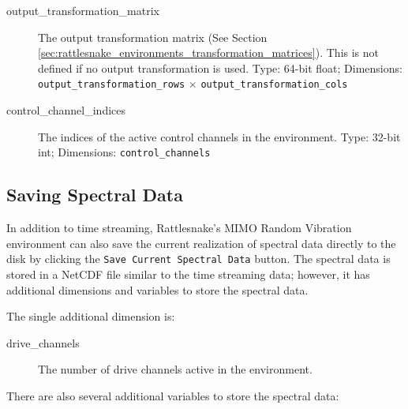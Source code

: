 \documentclass[pdf,12pt,report]{SANDreport}
\newcommand{\inlineCode}{\lstinline[basicstyle=\bfseries\ttfamily]}
\begin{document}
\begin{description}
        \item[output\_transformation\_matrix] The output transformation matrix (See Section \ref{sec:rattlesnake_environments_transformation_matrices}).  This is not defined if no output transformation is used.  Type: 64-bit float; Dimensions: \inlineCode{output_transformation_rows} $\times$ \inlineCode{output_transformation_cols}
        
        \item[control\_channel\_indices] The indices of the active control channels in the environment.  Type: 32-bit int; Dimensions: \inlineCode{control_channels}
        
    \end{description}
    
    \subsection{Saving Spectral Data}
    
    In addition to time streaming, Rattlesnake's \Ac{MIMO} Random Vibration environment can also save the current realization of spectral data directly to the disk by clicking the \inlineCode{Save Current Spectral Data} button.  The spectral data is stored in a NetCDF file similar to the time streaming data; however, it has additional dimensions and variables to store the spectral data.
    
    The single additional dimension is:
    
    \begin{description}
        \item[drive\_channels] The number of drive channels active in the environment.
    \end{description}
    
    There are also several additional variables to store the spectral data:
    
\end{document}
